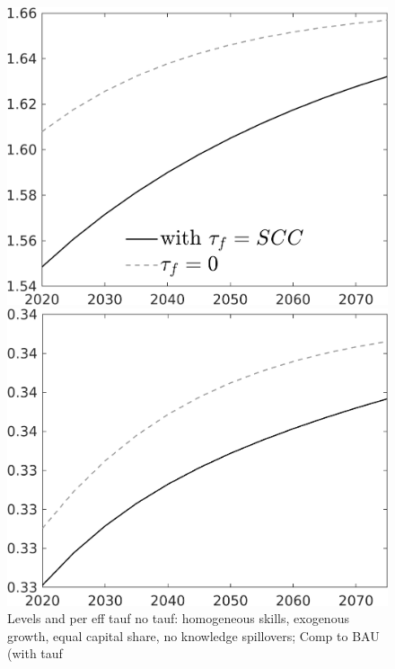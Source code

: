 \documentclass[12pt]{article}
\begin{document}
\begin{figure}[h!!]
	\centering
	\caption{Levels and per eff tauf no tauf: homogeneous skills, exogenous growth, equal capital share, no knowledge spillovers; Comp to BAU (with tauf}\label{fig:Leveltauf_nsk1_xgr1_equalcapShare_noknow_withtaul2}
	\begin{minipage}[]{0.32\textwidth}
		\includegraphics[width=1\textwidth]{../../codding_model/own_basedOnFried/optimalPol_010922_revision/figures/all_13Sept22/LevTaufNoTauf_TaulCalib_Equlab_regime0_pn_spillover0_nsk1_xgr1_knspil1_sep1_LFlimit0_emsbase0_countec0_GovRev0_etaa0.79_lgd1.png}
	\end{minipage}	
	\begin{minipage}[]{0.32\textwidth}
		\includegraphics[width=1\textwidth]{../../codding_model/own_basedOnFried/optimalPol_010922_revision/figures/all_13Sept22/LevTaufNoTauf_TaulCalib_Equlab_regime0_Ln_spillover0_nsk1_xgr1_knspil1_sep1_LFlimit0_emsbase0_countec0_GovRev0_etaa0.79_lgd0.png}

\end{minipage}
\end{figure}
\end{document}
